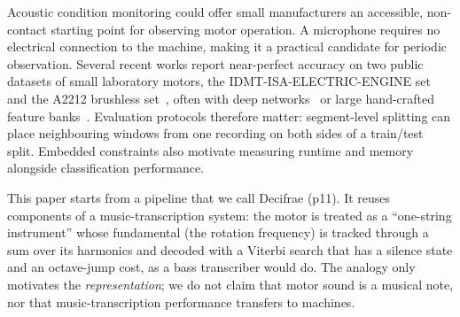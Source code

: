 \documentclass[conference]{IEEEtran}
\begin{document}
Acoustic condition monitoring could offer small manufacturers an accessible, non-contact
starting point for observing motor operation. A microphone requires no electrical connection to
the machine, making it a practical candidate for periodic observation. Several recent works report
near-perfect accuracy on two public datasets of small laboratory motors, the
IDMT-ISA-ELECTRIC-ENGINE set~\cite{grollmisch2019} and the A2212 brushless set~\cite{estacio2023},
often with deep networks~\cite{melcnn2025,ertarin2025} or large hand-crafted feature banks~\cite{etnext2026,tekin2025}.
Evaluation protocols therefore matter: segment-level splitting can place neighbouring windows
from one recording on both sides of a train/test split. Embedded constraints also motivate
measuring runtime and memory alongside classification performance.

This paper starts from a pipeline that we call Decifrae (p11). It reuses components of a
music-transcription system: the motor is treated as a ``one-string instrument'' whose
fundamental (the rotation frequency) is tracked through a sum over its harmonics and decoded with
a Viterbi search that has a silence state and an octave-jump cost, as a bass transcriber would do.
The analogy only motivates the \emph{representation}; we do not claim that motor sound is a
musical note, nor that music-transcription performance transfers to machines.
\end{document}
